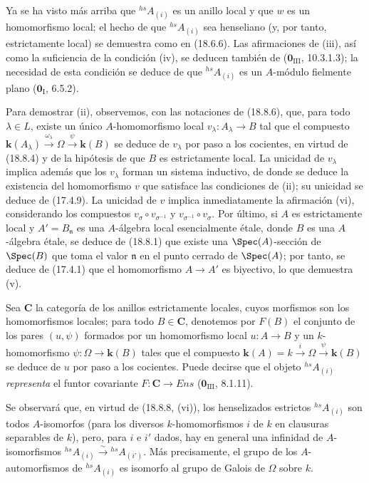 Ya se ha visto más arriba que ${}^{hs}\!A_{(i)}$ es un anillo local y que $w$ es un homomorfismo local; el hecho de que ${}^{hs}\!A_{(i)}$ sea henseliano (y, por tanto, estrictamente local) se demuestra como en (18.6.6). Las afirmaciones de (iii), así como la suficiencia de la condición (iv), se deducen también de ($\mathbf{0}_{\mathrm{III}}$, 10.3.1.3); la necesidad de esta condición se deduce de que ${}^{hs}\!A_{(i)}$ es un $A$-módulo fielmente plano ($\mathbf{0}_{\mathrm I}$, 6.5.2).

Para demostrar (ii), observemos, con las notaciones de (18.8.6), que, para todo $\lambda\in L$, existe un único $A$-homomorfismo local $v_\lambda:A_\lambda\to B$ tal que el compuesto $\boldsymbol{k}(A_\lambda)\xrightarrow{\omega_\lambda}\Omega\xrightarrow{\psi}\boldsymbol{k}(B)$ se deduce de $v_\lambda$ por paso a los cocientes, en virtud de (18.8.4) y de la hipótesis de que $B$ es estrictamente local. La unicidad de $v_\lambda$ implica además que los $v_\lambda$ forman un sistema inductivo, de donde se deduce la existencia del homomorfismo $v$ que satisface las condiciones de (ii); su unicidad se deduce de (17.4.9). La unicidad de $v$ implica inmediatamente la afirmación (vi), considerando los compuestos $v_\sigma\circ v_{\sigma^{-1}}$ y $v_{\sigma^{-1}}\circ v_\sigma$. Por último, si $A$ es estrictamente local y $A'=B_{\mathfrak n}$ es una $A$-álgebra local esencialmente étale, donde $B$ es una $A$-álgebra étale, se deduce de (18.8.1) que existe una $\Spec(A)$-sección de $\Spec(B)$ que toma el valor $\mathfrak n$ en el punto cerrado de $\Spec(A)$; por tanto, se deduce de (17.4.1) que el homomorfismo $A\to A'$ es biyectivo, lo que demuestra (v).

\begin{env}[18.8.8.1]
\label{IV.18.8.8.1}
Sea $\boldsymbol{C}$ la categoría de los anillos estrictamente locales, cuyos morfismos son los homomorfismos locales; para todo $B\in\boldsymbol{C}$, denotemos por $F(B)$ el conjunto de los pares $(u,\psi)$ formados por un homomorfismo local $u:A\to B$ y un $k$-homomorfismo $\psi:\Omega\to\boldsymbol{k}(B)$ tales que el compuesto $\boldsymbol{k}(A)=k\xrightarrow{i}\Omega\xrightarrow{\psi}\boldsymbol{k}(B)$ se deduce de $u$ por paso a los cocientes. Puede decirse que el objeto ${}^{hs}\!A_{(i)}$ \emph{representa} el funtor covariante $F:\boldsymbol{C}\to\boldsymbol{\mathit{Ens}}$ ($\mathbf{0}_{\mathrm{III}}$, 8.1.11).

Se observará que, en virtud de (18.8.8, (vi)), los henselizados estrictos ${}^{hs}\!A_{(i)}$ son todos $A$-isomorfos (para los diversos $k$-homomorfismos $i$ de $k$ en clausuras separables de $k$), pero, para $i$ e $i'$ dados, hay en general una infinidad de $A$-isomorfismos ${}^{hs}\!A_{(i)}\xrightarrow{\sim}{}^{hs}\!A_{(i')}$. Más precisamente, el grupo de los $A$-automorfismos de ${}^{hs}\!A_{(i)}$ es isomorfo al grupo de Galois de $\Omega$ sobre $k$.
\end{env}

